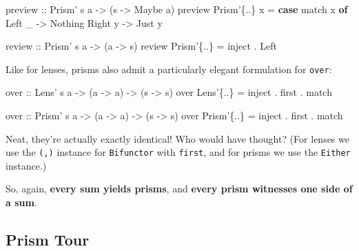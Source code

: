 \documentclass[]{article}
\newenvironment{Shaded}{}{}
\newcommand{\DataTypeTok}[1]{\textcolor[rgb]{0.56,0.13,0.00}{#1}}
\newcommand{\FunctionTok}[1]{\textcolor[rgb]{0.02,0.16,0.49}{#1}}
\newcommand{\KeywordTok}[1]{\textcolor[rgb]{0.00,0.44,0.13}{\textbf{#1}}}
\newcommand{\NormalTok}[1]{#1}
\newcommand{\OtherTok}[1]{\textcolor[rgb]{0.00,0.44,0.13}{#1}}
\begin{document}
\begin{Shaded}
\begin{Highlighting}[]
\OtherTok{preview ::} \DataTypeTok{Prism'}\NormalTok{ s a }\OtherTok{->}\NormalTok{ (s }\OtherTok{->} \DataTypeTok{Maybe}\NormalTok{ a)}
\NormalTok{preview }\DataTypeTok{Prism'}\NormalTok{\{}\FunctionTok{..}\NormalTok{\} x }\FunctionTok{=} \KeywordTok{case}\NormalTok{ match x }\KeywordTok{of}
    \DataTypeTok{Left}\NormalTok{ _  }\OtherTok{->} \DataTypeTok{Nothing}
    \DataTypeTok{Right}\NormalTok{ y }\OtherTok{->} \DataTypeTok{Just}\NormalTok{ y}

\OtherTok{review  ::} \DataTypeTok{Prism'}\NormalTok{ s a }\OtherTok{->}\NormalTok{ (a }\OtherTok{->}\NormalTok{ s)}
\NormalTok{review }\DataTypeTok{Prism'}\NormalTok{\{}\FunctionTok{..}\NormalTok{\} }\FunctionTok{=}\NormalTok{ inject }\FunctionTok{.} \DataTypeTok{Left}
\end{Highlighting}
\end{Shaded}

Like for lenses, prisms also admit a particularly elegant formulation for
\texttt{over}:

\begin{Shaded}
\begin{Highlighting}[]
\OtherTok{over ::} \DataTypeTok{Lens'}\NormalTok{ s a  }\OtherTok{->}\NormalTok{ (a }\OtherTok{->}\NormalTok{ a) }\OtherTok{->}\NormalTok{ (s }\OtherTok{->}\NormalTok{ s)}
\NormalTok{over }\DataTypeTok{Lens'}\NormalTok{\{}\FunctionTok{..}\NormalTok{\}  }\FunctionTok{=}\NormalTok{ inject }\FunctionTok{.}\NormalTok{ first }\FunctionTok{.}\NormalTok{ match}

\OtherTok{over ::} \DataTypeTok{Prism'}\NormalTok{ s a }\OtherTok{->}\NormalTok{ (a }\OtherTok{->}\NormalTok{ a) }\OtherTok{->}\NormalTok{ (s }\OtherTok{->}\NormalTok{ s)}
\NormalTok{over }\DataTypeTok{Prism'}\NormalTok{\{}\FunctionTok{..}\NormalTok{\} }\FunctionTok{=}\NormalTok{ inject }\FunctionTok{.}\NormalTok{ first }\FunctionTok{.}\NormalTok{ match}
\end{Highlighting}
\end{Shaded}

Neat, they're actually exactly identical! Who would have thought? (For lenses we
use the \texttt{(,)} instance for \texttt{Bifunctor} with \texttt{first}, and
for prisms we use the \texttt{Either} instance.)

So, again, \textbf{every sum yields prisms}, and \textbf{every prism witnesses
one side of a sum}.

\hypertarget{prism-tour}{%
\subsection{Prism Tour}\label{prism-tour}}
\end{document}
